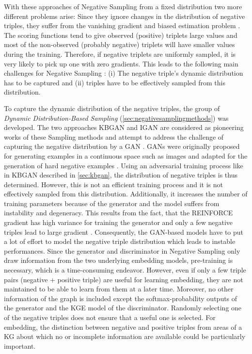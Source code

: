 With these approaches of Negative Sampling from a fixed distribution two more different problems arise:
Since they ignore changes in the distribution of negative triples, they suffer from the vanishing gradient and biased estimation problem \cite{zhang2021efficient}.
The scoring functions tend to give observed (positive) triplets large values and most of the non-observed (probably negative) triplets will have smaller values during the training.
Therefore, if negative triplets are uniformly sampled, it is very likely to pick up one with zero gradients.
This leads to the following main challenges for Negative Sampling \cite{zhang2021efficient}: 
(i) The negative triple's dynamic distribution has to be captured and 
(ii) triples have to be effectively sampled from this distribution.

To capture the dynamic distribution of the negative triples, the
group of \textit{Dynamic Distribution-Based Sampling} (\autoref{sec:negativesamplingmethods}) was developed.
The two approaches \ac{KBGAN} \cite{cai2017kbgan} and \ac{IGAN} \cite{IGAN} are considered as pioneering works of these Sampling methods and attempt to address the challenge of capturing the negative distribution by a \ac{GAN} \cite{zhang2021efficient}.
\acp{GAN} were originally proposed for generating examples in a continuous space such as images and adapted for the generation of hard negative examples \cite{zhang2021efficient}.
Using an adversarial training process like in \ac{KBGAN} described in \autoref{sec:kbgan}, the distribution of negative triples is thus determined.
However, this is not an efficient training process and it is not effectively sampled from this distribution.
Additionally, it increases the number of training parameters because of the generator and the model suffers from instability and degeneracy.
This results from the fact, that the \textsc{REINFORCE} gradient has high variance for training the generator and only a few negative triples lead to large gradient \cite{zhang2021efficient}.
Consequently, the \ac{GAN}-based models have to put a lot of effort to model the negative triple distribution which leads to instable performances.
Since the generator and discriminator in Negative Sampling only draw information from the two underlying embedding models, pre-training is necessary, which is a time-consuming endeavor.
However, even if only a few triple pairs (negative + positive triple) are useful for learning embedding, they are not maintained to be able to learn from them at a later time.
Moreover, no other information of the graph is included except the softmax-probability outputs of the generator and the \ac{KGE} model of the discriminator.
Randomly selecting one of the negative triples does not ensure that a useful one is selected.
For embedding, the distinction between negative and positive triples from areas of a \ac{KG} about which no or incomplete information are available could be particularly important.

